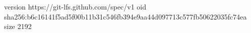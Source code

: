 version https://git-lfs.github.com/spec/v1
oid sha256:b6c16141f5ad5f00b11b31c546fb394e9aa44d097713c577fb50622035fc74ea
size 2192
